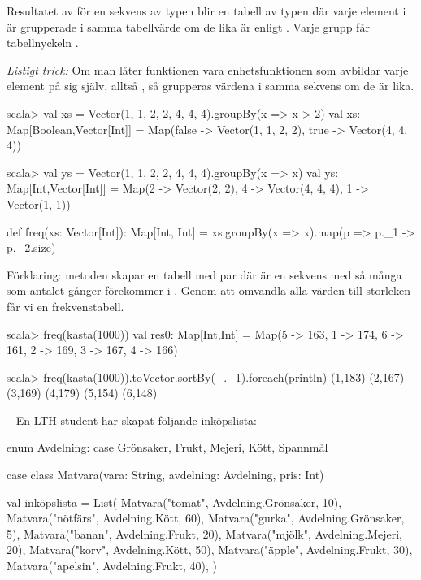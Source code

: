 Resultatet av  för en sekvens  av typen  blir en tabell av typen  där varje element  i  är grupperade i samma tabellvärde om de lika är enligt . Varje grupp får tabellnyckeln .

\emph{Listigt trick:} Om man låter funktionen  vara enhetsfunktionen som avbildar varje element på sig själv, alltså , så grupperas värdena i samma sekvens om de är lika.

\begin{REPL}
scala> val xs = Vector(1, 1, 2, 2, 4, 4, 4).groupBy(x => x > 2)
val xs: Map[Boolean,Vector[Int]] =
  Map(false -> Vector(1, 1, 2, 2), true -> Vector(4, 4, 4))

scala> val ys = Vector(1, 1, 2, 2, 4, 4, 4).groupBy(x => x)
val ys: Map[Int,Vector[Int]] =
  Map(2 -> Vector(2, 2), 4 -> Vector(4, 4, 4), 1 -> Vector(1, 1))
\end{REPL}


\SubtaskSolved

\begin{Code}
def freq(xs: Vector[Int]): Map[Int, Int] =
  xs.groupBy(x => x).map(p => p._1 -> p._2.size)
\end{Code}
Förklaring: metoden  skapar en tabell med par  där  är en sekvens med så många  som antalet gånger  förekommer i . Genom att omvandla alla värden  till storleken  får vi en frekvenstabell.

\begin{REPL}
scala> freq(kasta(1000))
val res0: Map[Int,Int] = 
  Map(5 -> 163, 1 -> 174, 6 -> 161, 2 -> 169, 3 -> 167, 4 -> 166)

scala> freq(kasta(1000)).toVector.sortBy(_._1).foreach(println)
(1,183)
(2,167)
(3,169)
(4,179)
(5,154)
(6,148)
\end{REPL}

\QUESTEND


\QUESTBEGIN

\Task \what~ En LTH-student har skapat följande inköpslista:

\begin{Code}
enum Avdelning:
  case Grönsaker, Frukt, Mejeri, Kött, Spannmål

case class Matvara(vara: String, avdelning: Avdelning, pris: Int)

val inköpslista = List(
    Matvara("tomat",   Avdelning.Grönsaker, 10),
    Matvara("nötfärs", Avdelning.Kött,      60),
    Matvara("gurka",   Avdelning.Grönsaker, 5),
    Matvara("banan",   Avdelning.Frukt,     20),
    Matvara("mjölk",   Avdelning.Mejeri,    20),
    Matvara("korv",    Avdelning.Kött,      50),
    Matvara("äpple",   Avdelning.Frukt,     30),
    Matvara("apelsin", Avdelning.Frukt,     40),
  )

\end{Code}

